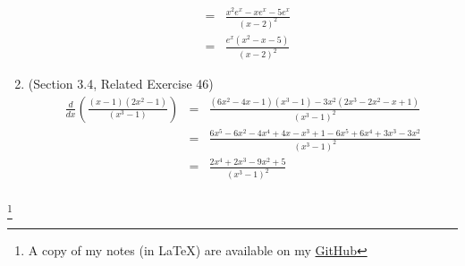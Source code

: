 \documentclass{article}
\newcommand\blfootnote[1]{
    \begingroup
    \renewcommand\thefootnote{}\footnote{#1}
    \addtocounter{footnote}{-1}
    \endgroup
}
\begin{document}
\begin{enumerate}
\begin{eqnarray}
            &=& \frac{x^2e^x - xe^x - 5e^x}{(x - 2)^2} \\
            &=& \frac{e^x(x^2 - x - 5)}{(x - 2)^2}
        \end{eqnarray}
    \item (Section 3.4, Related Exercise 46)
        \begin{eqnarray}
            \frac{d}{dx}\left(\frac{(x - 1)(2x^2 - 1)}{(x^3 - 1)}\right) &=& \frac{(6x^2-4x-1)(x^3-1) - 3x^2(2x^3 - 2x^2 - x + 1)}{(x^3 - 1)^2} \\
            &=& \frac{6x^5 - 6x^2 - 4x^4 + 4x - x^3 + 1 - 6x^5 + 6x^4 + 3x^3 - 3x^2}{(x^3 - 1)^2} \\
            &=& \frac{2x^4 + 2x^3 - 9x^2 + 5}{(x^3 - 1)^2} \\
        \end{eqnarray}
\end{enumerate}

\blfootnote{A copy of my notes (in \LaTeX) are available on my \href{https://github.com/onlinechronically/MATH-211}{GitHub}}
\end{document}
